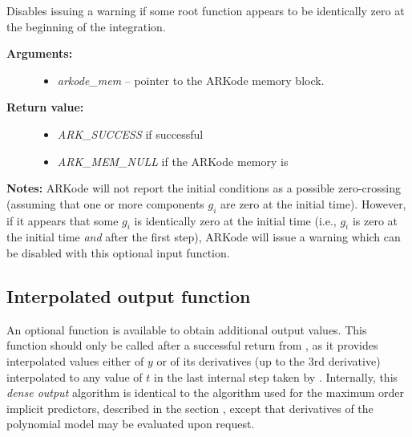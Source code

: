 \documentclass[letterpaper,10pt,english]{sphinxmanual}
\begin{document}
\begin{fulllineitems}
\label{c_interface/User_callable:c.ARKodeSetNoInactiveRootWarn}
Disables issuing a warning if some root function appears
to be identically zero at the beginning of the integration.
\begin{description}
\item[{\textbf{Arguments:}}] \leavevmode\begin{itemize}
\item {} 
\emph{arkode\_mem} -- pointer to the ARKode memory block.

\end{itemize}

\item[{\textbf{Return value:}}] \leavevmode\begin{itemize}
\item {} 
\emph{ARK\_SUCCESS} if successful

\item {} 
\emph{ARK\_MEM\_NULL} if the ARKode memory is 

\end{itemize}

\end{description}

\textbf{Notes:} ARKode will not report the initial conditions as a
possible zero-crossing (assuming that one or more components
\(g_i\) are zero at the initial time).  However, if it appears
that some \(g_i\) is identically zero at the initial time
(i.e., \(g_i\) is zero at the initial time \emph{and} after the
first step), ARKode will issue a warning which can be disabled with
this optional input function.

\end{fulllineitems}



\subsection{Interpolated output function}
\label{c_interface/User_callable:cinterface-interpolatedoutput}\label{c_interface/User_callable:interpolated-output-function}
An optional function {\hyperref[c_interface/User_callable:c.ARKodeGetDky]{\emph{}}} is available to obtain
additional output values.  This function should only be called after a
successful return from {\hyperref[c_interface/User_callable:c.ARKode]{\emph{}}}, as it provides interpolated
values either of \(y\) or of its derivatives (up to the 3rd
derivative) interpolated to any value of \(t\) in the last
internal step taken by {\hyperref[c_interface/User_callable:c.ARKode]{\emph{}}}.  Internally, this \emph{dense
output} algorithm is identical to the algorithm used for the maximum
order implicit predictors, described in the section
{\hyperref[Mathematics:mathematics-predictors-max]{\emph{}}}, except that derivatives of the
polynomial model may be evaluated upon request.
\end{document}
